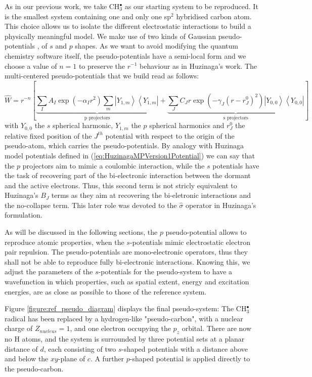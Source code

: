 \documentclass[12pt]{article}
\begin{document}
As in our previous work\cite{drujon_pseudopotentials_2013},
we take CH\(^{\bullet}_{3}\) as our starting system to be reproduced.
It is the smallest system containing one and only one sp$^2$ hybridised carbon atom.
This choice allows us to isolate the different electrostatic interactions
to build a physically meaningful model.
We make use of two kinds of Gaussian pseudo-potentials \cite{me_structure_theory}, of \(s\) and \(p\) shapes. As we want to avoid modifying the quantum chemistry software itself, the pseudo-potentials have a semi-local form and we choose a value of \(n = 1\) to preserve the \(r^{-1}\) behaviour as in Huzinaga's work.
The multi-centered pseudo-potentials that we build read as follows:
\begin{equation}
\label{eq:ourPP}
\hat{W} = r^{-n}\left[%
\underbrace{\sum_IA_I\exp(-\alpha_I r^2)\sum_m\left|Y_{1,m}\right>\left<Y_{1,m}\right|}_{\text{p projectors}}%
+%
\underbrace{\sum_JC_Jr\exp(-\gamma_J (r-r^0_J)^2)\left|Y_{0,0}\right>\left<Y_{0,0}\right|}_{\text{s projectors}}%
\right]
\end{equation}
with $Y_{0,0}$ the $s$ spherical harmonic, $Y_{1,m}$ the $p$ spherical harmonics and $r^0_J$ the relative fixed position of the $J^{th}$
potential with respect to the origin of the pseudo-atom, which carries the pseudo-potentials.
By analogy with Huzinaga model potentials defined in (\ref{eq:HuzinagaMPVersion1Potential})
we can say that the $p$ projectors aim to mimic a coulombic interaction,
while the $s$ potentials have the task of recovering part of the bi-electronic interaction
between the dormant and the active electrons.
Thus, this second term is not stricly equivalent to Huzinaga's $B_J$ terms as they aim at recovering
the bi-eletronic interactions and the no-collapse term.
This later role was devoted to the $\hat{\sigma}$ operator in Huzinaga's formulation.

As will be discussed in the following sections,
the \(p\) pseudo-potential allows to reproduce atomic properties, when the
\(s\)-potentials mimic electrostatic electron pair repulsion.
The pseudo-potentials are mono-electronic operators, thus they shall not be able to reproduce fully bi-electronic interactions.
Knowing this, we adjust the parameters of the \(s\)-potentials for the pseudo-system to have a wavefunction in which properties,
such as spatial extent, energy and excitation energies, are as close as possible to those of the reference system.

Figure \ref{figure:ref_pseudo_diagram} displays the final pseudo-system: The CH\(^{\bullet}_{3}\) radical has been replaced by
a hydrogen-like "pseudo-carbon", with a nuclear charge of \(Z_{nucleus} = 1\), and one electron occupying the \(p_{z}\) orbital. 
There are now no H atoms, and the system is surrounded by three potential sets at a planar distance of \(d\), each consisting of 
two \(s\)-shaped potentials with a distance above and below the \(xy\)-plane of \(c\). A further \(p\)-shaped potential is applied
directly to the pseudo-carbon.
\end{document}

